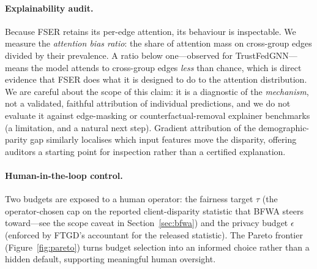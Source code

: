 \documentclass[pdflatex,sn-mathphys-num]{sn-jnl}
\theoremstyle{thmstyleone}%
\theoremstyle{thmstyletwo}%
\theoremstyle{thmstylethree}%
\begin{document}
\begin{table}[t]\centering\small
\caption{Composite trust score on Bail: utility, fairness, and privacy combined
via the arithmetic-mean ($p{=}1$) power mean, from the same canonical runs as
Tables~\ref{tab:main-auc}--\ref{tab:main-eod}. Non-private methods score $0$ on
privacy by construction. The calibration-augmented composite is in
Table~\ref{tab:efficiency}. Ranking is sensitive to the reference constants
(stated in text); best in bold.}
\label{tab:trust}

\end{table}

\paragraph{Explainability audit.}
Because FSER retains its per-edge attention, its behaviour is inspectable. We
measure the \emph{attention bias ratio}: the share of attention mass on
cross-group edges divided by their prevalence. A ratio below one---observed for
TrustFedGNN---means the model attends to cross-group edges \emph{less} than
chance, which is direct evidence that FSER does what it is designed to do to the
attention distribution. We are careful about the scope of this claim: it is a
diagnostic of the \emph{mechanism}, not a validated, faithful attribution of
individual predictions, and we do not evaluate it against edge-masking or
counterfactual-removal explainer benchmarks (a limitation, and a natural next
step). Gradient attribution of the demographic-parity gap similarly localises
which input features move the disparity, offering auditors a starting point for
inspection rather than a certified explanation.

\paragraph{Human-in-the-loop control.}
Two budgets are exposed to a human operator: the fairness target $\tau$ (the
operator-chosen cap on the reported client-disparity statistic that BFWA steers
toward---see the scope caveat in Section~\ref{sec:bfwa}) and the privacy budget
$\epsilon$ (enforced by FTGD's accountant for the released statistic). The Pareto
frontier (Figure~\ref{fig:pareto}) turns budget selection into an informed choice
rather than a hidden default, supporting meaningful human oversight.
\end{document}
